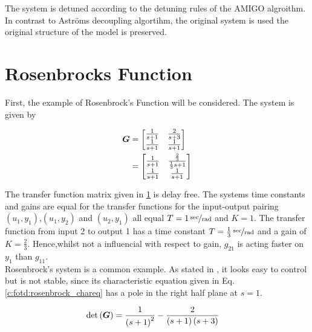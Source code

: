 The system is detuned according to the detuning rules of the AMIGO algroithm. In contrast to Aströms decoupling algortihm, the original system is used the original structure of the model is preserved.

\newpage
\section{Rosenbrocks Function}%
\label{c:fotd:s:rosenbrook}

First, the example of Rosenbrock's Function will be considered. The system is given by

\begin{align}
\begin{split}
\mbox{\boldmath$G$} &= \begin{bmatrix}
\frac{1}{s+1} & \frac{2}{s+3} \\
\frac{1}{s+1} & \frac{1}{s+1}
\end{bmatrix}
\\
&=\begin{bmatrix}
\frac{1}{s+1} & \frac{\frac{2}{3}}{\frac{1}{3}s+1} \\
\frac{1}{s+1} & \frac{1}{s+1}
\end{bmatrix} 
\end{split}
\label{c:fotd:e:rosenbrock_sys}
\end{align}

The transfer function matrix given in \ref{c:fotd:s:rosenbrook} is delay free. The systems time constants and gains are equal for the transfer functions for the input-output pairing  $(u_1, y_1)$,$(u_1,y_2)$ and $(u_2,y_1)$ all equal $T = \unitfrac[1]{sec}{rad}$ and $K = 1$. The transfer function from input 2 to output 1 has a time constant $T = \unitfrac[\frac{1}{3}]{sec}{rad}$ and a gain of $K = \frac{2}{3}$. Hence,whilst not a influencial with respect to gain, $g_{21}$ is acting faster on $y_1$ than $g_{11}$.\\ 

Rosenbrock's system is a common example. As stated in \cite{Astrom2001a}, it looks easy to control but is not stable, since its characteristic equation given in Eq. \ref{c:fotd:rosenbrock_chareq} has a pole in the right half plane at $s=1$.

\begin{align}
\begin{split}
\det\left( \mbox{\boldmath$G$} \right) &= \frac{1}{\left( s + 1\right)^2} - \frac{2}{\left( s + 1\right) \left( s + 3\right)}
\end{split}
\label{c:fotd:rosenbrock_chareq}
\end{align}

